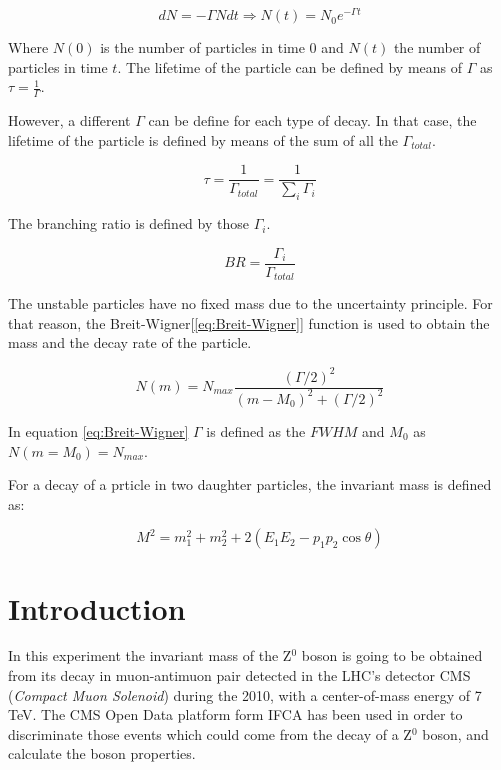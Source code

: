\documentclass[twoside]{article}
\begin{document}
\begin{multicols}{2}
					\begin{equation}
						dN = -\Gamma N dt \Rightarrow N(t) = N_{0}e^{-\Gamma t}
						\label{eq:decayRate}
					\end{equation}

				Where $N(0)$ is the number of particles in time 0 and $N(t)$ the number of particles in time $t$. The lifetime of the particle can be defined by means of $\Gamma$ as $\tau = \frac{1}{\Gamma}$.

				However, a different $\Gamma$ can be define for each type of decay. In that case, the lifetime of the particle is defined by means of the sum of all the $\Gamma_{total}$.

					\begin{equation}
						\tau = \frac{1}{\Gamma_{total}} = \frac{1}{\sum_i \Gamma_{i}}
						\label{eq:totalGamma}
					\end{equation}

				The branching ratio is defined by those $\Gamma_i$.

					\begin{equation}
						BR = \frac{\Gamma_{i}} {\Gamma_{total}}
						\label{eq:BR}
					\end{equation}

				The unstable particles have no fixed mass due to the uncertainty principle. For that reason, the Breit-Wigner[\ref{eq:Breit-Wigner}] function is used to obtain the mass and the decay rate of the particle.

					\begin{equation}
						N(m) = N_{max} \frac{(\Gamma/2)^2}{(m-M_0)^2 + (\Gamma/2)^2}
						\label{eq:Breit-Wigner}
					\end{equation}

				In equation \ref{eq:Breit-Wigner} $\Gamma$ is defined as the $FWHM$ and $M_0$ as $N(m=M_0) = N_{max}$. 

				For a decay of a prticle in two daughter particles, the invariant mass is defined as:

					\begin{equation}
						M^{2} = m_{1}^{2} + m_{2}^{2} + 2(E_{1}E_{2} - p_{1}p_{2}\cos\theta)
						\label{eq:invariantMass}
					\end{equation}

		\section{Introduction}

			In this experiment the invariant mass of the Z$^0$ boson is going to be obtained from its decay in muon-antimuon pair detected in the LHC's detector CMS (\textit{Compact Muon Solenoid}) during the 2010, with a center-of-mass energy of 7 TeV. The CMS Open Data platform form IFCA has been used in order to discriminate those events which could come from the decay of a Z$^0$ boson, and calculate the boson properties.


\end{multicols}
\end{document}
